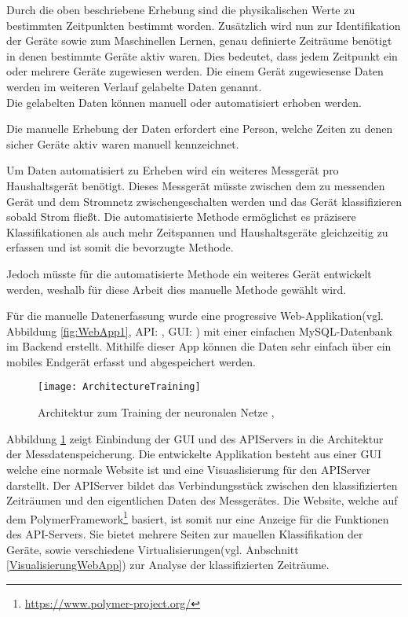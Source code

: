        Durch die oben beschriebene Erhebung sind die physikalischen Werte zu bestimmten Zeitpunkten bestimmt worden.
        Zusätzlich wird nun zur Identifikation der Geräte sowie zum Maschinellen Lernen, genau definierte Zeiträume benötigt in denen bestimmte Geräte aktiv waren.
        Dies bedeutet, dass jedem Zeitpunkt ein oder mehrere Geräte zugewiesen werden. Die einem Gerät zugewiesense Daten werden im weiteren Verlauf gelabelte Daten genannt.\\
        \newline
        Die gelabelten Daten können manuell oder automatisiert erhoben werden.

        Die manuelle Erhebung der Daten erfordert eine Person, welche Zeiten zu denen sicher Geräte aktiv waren manuell kennzeichnet.

        Um Daten automatisiert zu Erheben wird ein weiteres Messgerät pro Haushaltsgerät benötigt.
        Dieses Messgerät müsste zwischen dem zu messenden Gerät und dem Stromnetz zwischengeschalten werden und das Gerät klassifizieren sobald Strom fließt.
        Die automatisierte Methode ermöglichst es präzisere Klassifikationen als auch mehr Zeitspannen und Haushaltsgeräte gleichzeitig zu erfassen und ist somit die bevorzugte Methode.

        Jedoch müsste für die automatisierte Methode ein weiteres Gerät entwickelt werden, weshalb für diese Arbeit dies manuelle Methode gewählt wird.\\
        \newline

        Für die manuelle Datenerfassung wurde eine progressive Web-Applikation(vgl. Abbildung \ref{fig:WebApp1}, API: \cite{WesenseAPIRepo}, GUI: \cite{WesenseGUIRepo}) mit einer einfachen MySQL-Datenbank im Backend erstellt.
        Mithilfe dieser App können die Daten sehr einfach über ein mobiles Endgerät erfasst und abgespeichert werden.
        \newline

        \begin{figure}[h]
            \centering
            \texttt{[image: ArchitectureTraining]}
            \caption{Architektur zum Training der neuronalen Netze \protect\cite{DrawIO}, \protect\cite{Tensorflow}}
            \label{fig:ArchitectureTraining}
        \end{figure}

        Abbildung \ref{fig:ArchitectureTraining} zeigt Einbindung der GUI und des API\-Servers in die Architektur der Messdatenspeicherung.
        Die entwickelte Applikation besteht aus einer GUI welche eine normale Website ist und eine Visuaslisierung für den API\-Server darstellt.
        Der API\-Server bildet das Verbindungsstück zwischen den klassifizierten Zeiträumen und den eigentlichen Daten des Messgerätes.
        Die Website, welche auf dem Polymer\-Framework\footnote{\url{https://www.polymer-project.org/}} basiert, ist somit nur eine Anzeige für die Funktionen des API-Servers.
        Sie bietet mehrere Seiten zur mauellen Klassifikation der Geräte, sowie verschiedene Virtualisierungen(vgl. Anbschnitt \ref{VisualisierungWebApp}) zur Analyse der klassifizierten Zeiträume.

